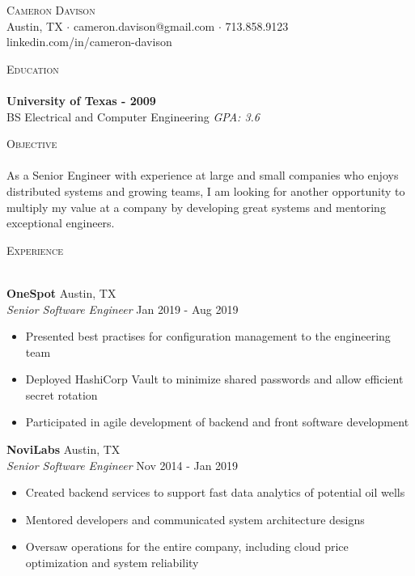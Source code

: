 \documentclass[a4paper]{article}
\newcommand{\lineunder} {
    \vspace*{-8pt} \\
    \hspace*{-18pt} \hrulefill \\
}
\newcommand{\header} [1] {
    {\hspace*{-18pt}\vspace*{6pt} \textsc{#1}}
    \vspace*{-6pt} \lineunder
}
\begin{document}
\vspace*{-40pt}

\vspace*{-10pt}
\begin{center}
    {\Huge \scshape {Cameron Davison}}\\
    Austin, TX $\cdot$ cameron.davison@gmail.com $\cdot$ 713.858.9123\\
    linkedin.com/in/cameron-davison\\
\end{center}

\header{Education}
\textbf{University of Texas - 2009}\\
BS Electrical and Computer Engineering \textit{GPA: 3.6}\\
\vspace{2mm}

\header{Objective}
As a Senior Engineer with experience at large and small companies who enjoys distributed systems and growing teams, I
am looking for another opportunity to multiply my value at a company by developing great systems and mentoring
exceptional engineers.
\vspace{2mm}

\header{Experience}
\vspace{1mm}

\textbf{OneSpot} \hfill Austin, TX\\
\textit{Senior Software Engineer} \hfill Jan 2019 - Aug 2019\\
\vspace{-1mm}
\begin{itemize} \itemsep 1pt
\item Presented best practises for configuration management to the engineering team
\item Deployed HashiCorp Vault to minimize shared passwords and allow efficient secret rotation
\item Participated in agile development of backend and front software development
\end{itemize}

\textbf{NoviLabs} \hfill Austin, TX\\
\textit{Senior Software Engineer} \hfill Nov 2014 - Jan 2019\\
\vspace{-1mm}
\begin{itemize} \itemsep 1pt
\item Created backend services to support fast data analytics of potential oil wells
\item Mentored developers and communicated system architecture designs
\item Oversaw operations for the entire company, including cloud price optimization and system reliability
\end{itemize}
\end{document}
